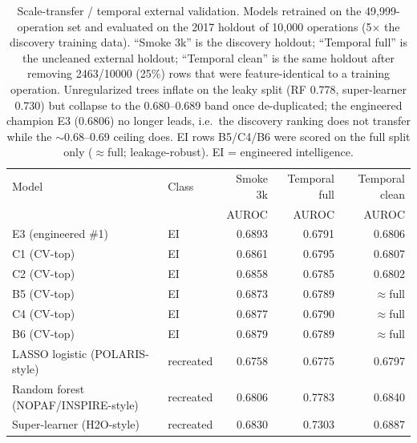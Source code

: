 \begin{table}[ht]
\centering
\small
\caption{Scale-transfer / temporal external validation. Models retrained on the 49,999-operation set and evaluated on the 2017 holdout of 10,000 operations (5$\times$ the discovery training data). ``Smoke 3k'' is the discovery holdout; ``Temporal full'' is the uncleaned external holdout; ``Temporal clean'' is the same holdout after removing 2463/10000 (25\%) rows that were feature-identical to a training operation. Unregularized trees inflate on the leaky split (RF 0.778, super-learner 0.730) but collapse to the 0.680--0.689 band once de-duplicated; the engineered champion E3 (0.6806) no longer leads, i.e.\ the discovery ranking does not transfer while the $\sim$0.68--0.69 ceiling does. EI rows B5/C4/B6 were scored on the full split only ($\approx$full; leakage-robust). EI = engineered intelligence.}
\label{tab:temporal}
\begin{tabular}{llrrr}
\toprule
Model & Class & Smoke 3k & Temporal full & Temporal clean \\
 & & AUROC & AUROC & AUROC \\
\midrule
E3 (engineered \#1) & EI & 0.6893 & 0.6791 & 0.6806 \\
C1 (CV-top) & EI & 0.6861 & 0.6795 & 0.6807 \\
C2 (CV-top) & EI & 0.6858 & 0.6785 & 0.6802 \\
B5 (CV-top) & EI & 0.6873 & 0.6789 & $\approx$full \\
C4 (CV-top) & EI & 0.6877 & 0.6790 & $\approx$full \\
B6 (CV-top) & EI & 0.6879 & 0.6789 & $\approx$full \\
LASSO logistic (POLARIS-style) & recreated & 0.6758 & 0.6775 & 0.6797 \\
Random forest (NOPAF/INSPIRE-style) & recreated & 0.6806 & 0.7783 & 0.6840 \\
Super-learner (H2O-style) & recreated & 0.6830 & 0.7303 & 0.6887 \\
\bottomrule
\end{tabular}
\end{table}
